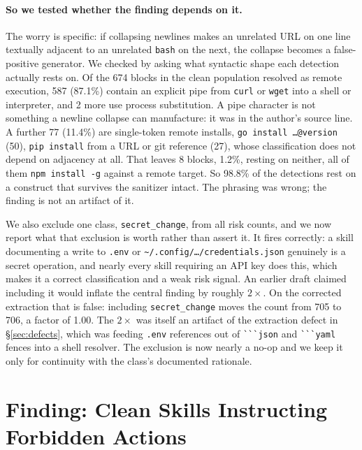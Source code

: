 \documentclass[10pt]{article}
\begin{document}
\paragraph{So we tested whether the finding depends on it.} The worry is specific: if
collapsing newlines makes an unrelated URL on one line textually adjacent to an
unrelated \texttt{bash} on the next, the collapse becomes a false-positive generator.
We checked by asking what syntactic shape each detection actually rests on. Of the 674
blocks in the clean population resolved as remote execution, 587 (87.1\%) contain an
explicit pipe from \texttt{curl} or \texttt{wget} into a shell or interpreter, and 2
more use process substitution. A pipe character is not something a newline collapse
can manufacture: it was in the author's source line. A further 77 (11.4\%) are
single-token remote installs, \texttt{go install \ldots @version} (50),
\texttt{pip install} from a URL or git reference (27), whose classification does not
depend on adjacency at all. That leaves 8 blocks, 1.2\%, resting on neither, all of
them \texttt{npm install -g} against a remote target. So 98.8\% of the detections rest
on a construct that survives the sanitizer intact. The phrasing was wrong; the finding
is not an artifact of it.

We also exclude one class, \texttt{secret\_change}, from all risk counts, and we now
report what that exclusion is worth rather than assert it. It fires correctly: a skill
documenting a write to \texttt{.env} or
\texttt{\textasciitilde{}/.config/\ldots/credentials.json} genuinely is a secret
operation, and nearly every skill requiring an API key does this, which makes it a
correct classification and a weak risk signal. An earlier draft claimed including it
would inflate the central finding by roughly $2\times$. On the corrected extraction
that is false: including \texttt{secret\_change} moves the count from 705 to 706, a
factor of 1.00. The $2\times$ was itself an artifact of the extraction defect in
\S\ref{sec:defects}, which was feeding \texttt{.env} references out of
\texttt{\lstinline!```!json} and \texttt{\lstinline!```!yaml} fences into a shell
resolver. The exclusion is now nearly a no-op and we keep it only for continuity with
the class's documented rationale.

\section{Finding: Clean Skills Instructing Forbidden Actions}
\label{sec:permission}
\end{document}

